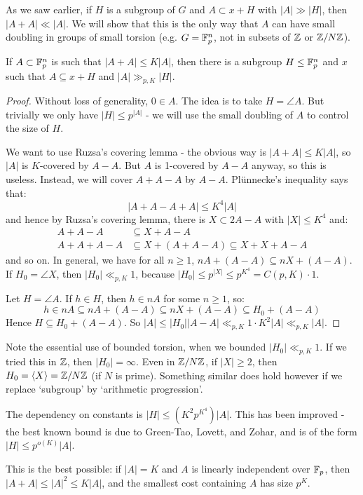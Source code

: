 \documentclass[10pt,a4paper]{article}
\begin{document}
As we saw earlier, if $H$ is a subgroup of $G$ and $A \subset x+H$ with $|A|\gg|H|$, then $|A+A| \ll |A|$. We will show that this is the only way that $A$ can have small doubling in groups of small torsion (e.g. $G = \mathbb{F}_p^n$, not in subsets of $\mathbb{Z}$ or $\mathbb{Z}/N\mathbb{Z}$).
\begin{theorem}
  If $A \subset \mathbb{F}_p^n$ is such that $|A+A|\leq K|A|$, then there is a subgroup $H \leq \mathbb{F}_p^n$ and $x$ such that $A \subseteq x+H$ and $|A|\gg_{p, K}|H|$.
\end{theorem}
\begin{proof}
  Without loss of generality, $0 \in A$. The idea is to take $H = \angle{A}$. But trivially we only have $|H|\leq p^{|A|}$ - we will use the small doubling of $A$ to control the size of $H$.

  We want to use Ruzsa's covering lemma - the obvious way is $|A+A|\leq K|A|$, so $|A|$ is $K$-covered by $A-A$. But $A$ is 1-covered by $A-A$ anyway, so this is useless. Instead, we will cover $A+A-A$ by $A-A$. Pl\"unnecke's inequality says that:
  \[|A+A-A+A| \leq K^4|A|\]
  and hence by Ruzsa's covering lemma, there is $X \subset 2A-A$ with $|X|\leq K^4$ and:
  \begin{align*}
    A+A-A &\subseteq X+A-A\\
    A+A+A-A & \subseteq X+(A+A-A) \subseteq X+X+A-A
  \end{align*}
  and so on. In general, we have for all $n \geq 1$, $nA+(A-A) \subseteq nX + (A-A)$. If $H_0 = \angle{X}$, then $|H_0| \ll_{p,K} 1$, because $|H_0| \leq p^{|X|} \leq p^{K^4} = C(p,K) \cdot 1$.

  Let $H = \angle{A}$. If $h \in H$, then $h \in nA$ for some $n \geq 1$, so:
  \[h \in nA \subseteq nA + (A-A) \subseteq nX + (A-A) \subseteq H_0 + (A-A)\]
  Hence $H \subseteq H_0 + (A-A)$. So $|A| \leq |H_0||A-A|\ll_{p,K} 1\cdot K^2|A| \ll_{p,K} |A|$.
\end{proof}
Note the essential use of bounded torsion, when we bounded $|H_0|\ll_{p,K} 1$. If we tried this in $\mathbb{Z}$, then $|H_0| = \infty$. Even in $\mathbb{Z}/N\mathbb{Z}$, if $|X|\geq 2$, then $H_0 = \langle X \rangle = \mathbb{Z}/N\mathbb{Z}$ (if $N$ is prime). Something similar does hold however if we replace `subgroup' by `arithmetic progression'.

The dependency on constants is $|H| \leq (K^2 p^{K^4}) |A|$. This has been improved - the best known bound is due to Green-Tao, Lovett, and Zohar, and is of the form $|H| \leq p^{o(K)} |A|$.

This is the best possible: if $|A| = K$ and $A$ is linearly independent over $\mathbb{F}_p$, then $|A+A|\leq |A|^2 \leq K|A|$, and the smallest cost containing $A$ has size $p^K$.
\end{document}
